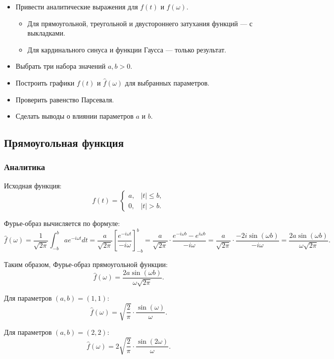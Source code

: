 \documentclass[a4paper,12pt]{article}
\begin{document}
\begin{itemize}
    \item Привести аналитические выражения для \( f(t) \) и \(\hat{f}(\omega)\).
    \begin{itemize}
        \item Для прямоугольной, треугольной и двустороннего затухания функций — с выкладками.
        \item Для кардинального синуса и функции Гаусса — только результат.
    \end{itemize}

    \item Выбрать три набора значений \( a, b > 0 \).

    \item Построить графики \( f(t) \) и \(\hat{f}(\omega)\) для выбранных параметров.

    \item Проверить равенство Парсеваля.

    \item Сделать выводы о влиянии параметров \( a \) и \( b \).
\end{itemize}

\subsection{Прямоугольная функция}
\subsubsection{Аналитика}
Исходная функция:
\[
f(t) = 
\begin{cases} 
a, & |t| \leq b, \\
0, & |t| > b.
\end{cases}
\]

Фурье-образ вычисляется по формуле:
\[
\hat{f}(\omega) = \frac{1}{\sqrt{2\pi}} \int_{-b}^{b} a e^{-i\omega t} dt = \frac{a}{\sqrt{2\pi}} \left[ \frac{e^{-i\omega t}}{-i\omega} \right]_{-b}^{b} = \frac{a}{\sqrt{2\pi}} \cdot \frac{e^{-i\omega b} - e^{i\omega b}}{-i\omega} = \frac{a}{\sqrt{2\pi}} \cdot \frac{-2i \sin(\omega b)}{-i\omega} = \frac{2a \sin(\omega b)}{\omega \sqrt{2\pi}}.
\]

Таким образом, Фурье-образ прямоугольной функции:
\[
\hat{f}(\omega) = \frac{2a \sin(\omega b)}{\omega \sqrt{2\pi}}.
\]


Для параметров \( (a, b) = (1, 1) \):
\[
\hat{f}(\omega) = \sqrt{\frac{2}{\pi}} \cdot \frac{\sin(\omega)}{\omega}.
\]

Для параметров \( (a, b) = (2, 2) \):
\[
\hat{f}(\omega) = 2 \sqrt{\frac{2}{\pi}} \cdot \frac{\sin(2\omega)}{\omega}.
\]
\end{document}
